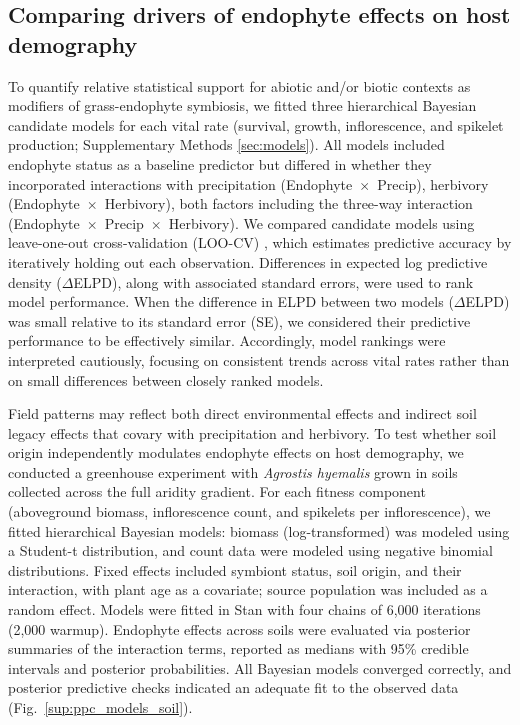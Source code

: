 \documentclass[12pt]{article}\usepackage[]{graphicx}\usepackage[dvipsnames]{xcolor}
\newcommand{\tom}[2]{{\color{red}{#1}}\footnote{\textit{\color{red}{#2}}}}
\begin{document}
\subsection*{Comparing drivers of endophyte effects on host demography}
To quantify relative statistical support for abiotic and/or biotic contexts as modifiers of grass-endophyte symbiosis, we fitted three hierarchical Bayesian candidate models for each vital rate (survival, growth, inflorescence, and spikelet production; Supplementary Methods \ref{sec:models}).
All models included endophyte status as a baseline predictor but differed in whether they incorporated interactions with precipitation (Endophyte~$\times$~Precip), herbivory (Endophyte~$\times$~Herbivory), both factors including the three-way interaction (Endophyte~$\times$~Precip~$\times$~Herbivory).
We compared candidate models using leave-one-out cross-validation (LOO-CV) \citep{vehtari2017practical}, which estimates predictive accuracy by iteratively holding out each observation. 
Differences in expected log predictive density ($\Delta$ELPD), along with associated standard errors, were used to rank model performance.
When the difference in ELPD between two models ($\Delta$ELPD) was small relative to its standard error (SE), we considered their predictive performance to be effectively similar. 
Accordingly, model rankings were interpreted cautiously, focusing on consistent trends across vital rates rather than on small differences between closely ranked models.

Field patterns may reflect both direct environmental effects and indirect soil legacy effects that covary with precipitation and herbivory.  
To test whether soil origin independently modulates endophyte effects on host demography, we conducted a greenhouse experiment with \emph{Agrostis hyemalis} grown in soils collected across the full aridity gradient. 
For each fitness component (aboveground biomass, inflorescence count, and spikelets per inflorescence), we fitted hierarchical Bayesian models: biomass (log-transformed) was modeled using a Student-t distribution, and count data were modeled using negative binomial distributions. 
Fixed effects included symbiont status, soil origin, and their interaction, with plant age as a covariate; source population was included as a random effect. 
Models were fitted in Stan with four chains of 6,000 iterations (2,000 warmup). 
Endophyte effects across soils were evaluated via posterior summaries of the interaction terms, reported as medians with 95\% credible intervals and posterior probabilities.
All Bayesian models converged correctly, and posterior predictive checks indicated an adequate fit to the observed data (Fig.~\ref{sup:ppc_models_soil}).
\end{document}

